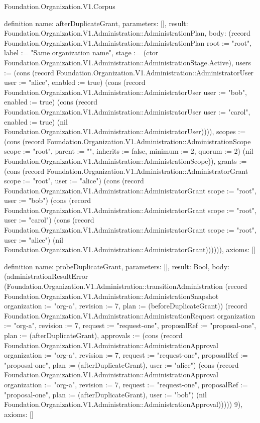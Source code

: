 \begin{lexlean}{Foundation.Organization.V1.Corpus}
\begin{semanticmodule}
definition{
  name: afterDuplicateGrant,
  parameters: [],
  result: Foundation.Organization.V1.Administration::AdministrationPlan,
  body: (record Foundation.Organization.V1.Administration::AdministrationPlan {root := "root", label := "Same organization name", stage := (ctor Foundation.Organization.V1.Administration::AdministrationStage.Active), users := (cons (record Foundation.Organization.V1.Administration::AdministratorUser {user := "alice", enabled := true}) (cons (record Foundation.Organization.V1.Administration::AdministratorUser {user := "bob", enabled := true}) (cons (record Foundation.Organization.V1.Administration::AdministratorUser {user := "carol", enabled := true}) (nil Foundation.Organization.V1.Administration::AdministratorUser)))), scopes := (cons (record Foundation.Organization.V1.Administration::AdministrationScope {scope := "root", parent := "", inherits := false, minimum := 2, quorum := 2}) (nil Foundation.Organization.V1.Administration::AdministrationScope)), grants := (cons (record Foundation.Organization.V1.Administration::AdministratorGrant {scope := "root", user := "alice"}) (cons (record Foundation.Organization.V1.Administration::AdministratorGrant {scope := "root", user := "bob"}) (cons (record Foundation.Organization.V1.Administration::AdministratorGrant {scope := "root", user := "carol"}) (cons (record Foundation.Organization.V1.Administration::AdministratorGrant {scope := "root", user := "alice"}) (nil Foundation.Organization.V1.Administration::AdministratorGrant)))))}),
  axioms: []
}

definition{
  name: probeDuplicateGrant,
  parameters: [],
  result: Bool,
  body: (administrationResultError (Foundation.Organization.V1.Administration::transitionAdministration (record Foundation.Organization.V1.Administration::AdministrationSnapshot {organization := "org-a", revision := 7, plan := (beforeDuplicateGrant)}) (record Foundation.Organization.V1.Administration::AdministrationRequest {organization := "org-a", revision := 7, request := "request-one", proposalRef := "proposal-one", plan := (afterDuplicateGrant), approvals := (cons (record Foundation.Organization.V1.Administration::AdministrationApproval {organization := "org-a", revision := 7, request := "request-one", proposalRef := "proposal-one", plan := (afterDuplicateGrant), user := "alice"}) (cons (record Foundation.Organization.V1.Administration::AdministrationApproval {organization := "org-a", revision := 7, request := "request-one", proposalRef := "proposal-one", plan := (afterDuplicateGrant), user := "bob"}) (nil Foundation.Organization.V1.Administration::AdministrationApproval)))})) 9),
  axioms: []
}


\end{semanticmodule}
\end{lexlean}

